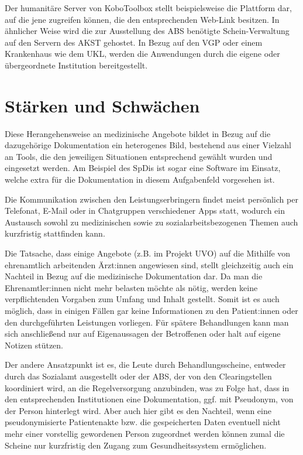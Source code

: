 Der humanitäre Server von KoboToolbox stellt beispielsweise die Plattform dar, auf die jene zugreifen können, die den entsprechenden Web-Link besitzen. In ähnlicher Weise wird die zur Ausstellung des \ac{ABS} benötigte Schein-Verwaltung auf den Servern des \ac{AKST} gehostet. In Bezug auf den \ac{VGP} oder einem Krankenhaus wie dem \ac{UKL}, werden die Anwendungen durch die eigene oder übergeordnete Institution bereitgestellt.


\section{Stärken und Schwächen}

Diese Herangehensweise an medizinische Angebote bildet in Bezug auf die dazugehörige Dokumentation ein heterogenes Bild, bestehend aus einer Vielzahl an Tools, die den jeweiligen Situationen entsprechend gewählt wurden und eingesetzt werden. Am Beispiel des \acp{SpDi} ist sogar eine Software im Einsatz, welche extra für die Dokumentation in diesem Aufgabenfeld vorgesehen ist.

Die Kommunikation zwischen den Leistungserbringern findet meist persönlich per Telefonat, E-Mail oder in Chatgruppen verschiedener Apps statt, wodurch ein Austausch sowohl zu medizinischen sowie zu sozialarbeitsbezogenen Themen auch kurzfristig stattfinden kann.

Die Tatsache, dass einige Angebote (z.B. im Projekt \ac{UVO}) auf die Mithilfe von ehrenamtlich arbeitenden Ärzt:innen angewiesen sind, stellt gleichzeitig auch ein Nachteil in Bezug auf die medizinische Dokumentation dar. Da man die Ehrenamtler:innen nicht mehr belasten möchte als nötig, werden keine verpflichtenden Vorgaben zum Umfang und Inhalt gestellt. Somit ist es auch möglich, dass in einigen Fällen gar keine Informationen zu den Patient:innen oder den durchgeführten Leistungen vorliegen. Für spätere Behandlungen kann man sich anschließend nur auf Eigenaussagen der Betroffenen oder halt auf eigene Notizen stützen.

Der andere Ansatzpunkt ist es, die Leute durch Behandlungsscheine, entweder durch das Sozialamt ausgestellt oder der \ac{ABS}, der von den Clearingstellen koordiniert wird, an die Regelversorgung anzubinden, was zu Folge hat, dass in den entsprechenden Institutionen eine Dokumentation, ggf. mit Pseudonym, von der Person hinterlegt wird. Aber auch hier gibt es den Nachteil, wenn eine pseudonymisierte Patientenakte bzw. die gespeicherten Daten eventuell nicht mehr einer vorstellig gewordenen Person zugeordnet werden können zumal die Scheine nur kurzfristig den Zugang zum Gesundheitssystem ermöglichen.


